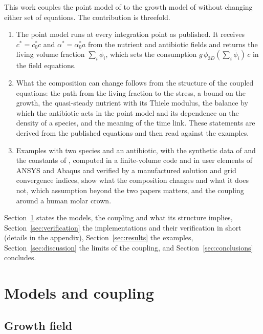 \documentclass[11pt,a4paper]{article}
\newcommand{\phiD}{\phi_{3D}}
\newcommand{\lv}{\textstyle\sum_i\bar\phi_i}
\begin{document}
This work couples the point model of \citet{Klempt2026ContinuumBacterialGrowth} to the growth model of \citet{Klempt2024DiffusionDrivenGrowth} without changing either set of equations. The contribution is threefold.
\begin{enumerate}
\item The point model runs at every integration point as published. It receives $c^*=c^*_0c$ and $\alpha^*=\alpha^*_0a$ from the nutrient and antibiotic fields and returns the living volume fraction $\lv$, which sets the consumption $g\,\phiD(\lv)\,c$ in the field equations.
\item What the composition can change follows from the structure of the coupled equations: the path from the living fraction to the stress, a bound on the growth, the quasi-steady nutrient with its Thiele modulus, the balance by which the antibiotic acts in the point model and its dependence on the density of a species, and the meaning of the time link. These statements are derived from the published equations and then read against the examples.
\item Examples with two species and an antibiotic, with the synthetic data of \citet{Fritsch2025BayesianMicrofilms} and the constants of \citet{Klempt2024DiffusionDrivenGrowth,Klempt2026ContinuumBacterialGrowth}, computed in a finite-volume code and in user elements of ANSYS and Abaqus and verified by a manufactured solution and grid convergence indices, show what the composition changes and what it does not, which assumption beyond the two papers matters, and the coupling around a human molar crown.
\end{enumerate}
Section~\ref{sec:models} states the models, the coupling and what its structure implies, Section~\ref{sec:verification} the implementations and their verification in short (details in the appendix), Section~\ref{sec:results} the examples, Section~\ref{sec:discussion} the limits of the coupling, and Section~\ref{sec:conclusions} concludes.

\section{Models and coupling}
\label{sec:models}

\subsection{Growth field}
\label{sec:field}
\end{document}
